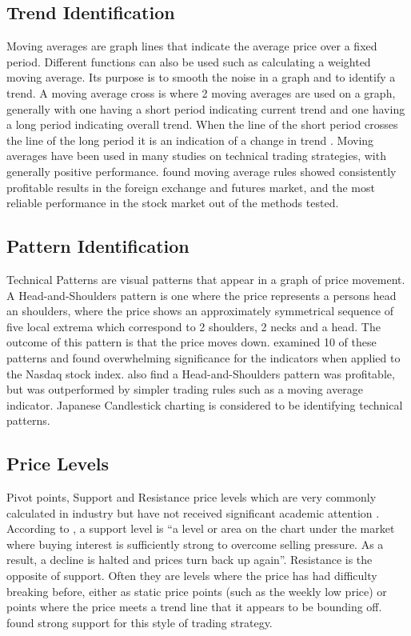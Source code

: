 \documentclass{article}
\theoremstyle{definition}
\begin{document}
\subsection{Trend Identification}
Moving averages are graph lines that indicate the average price over a fixed period. Different functions can also be used such as calculating a weighted moving average. Its purpose is to smooth the noise in a graph and to identify a trend. A moving average cross is where 2 moving averages are used on a graph, generally with one having a short period indicating current trend and one having a long period indicating overall trend. When the line of the short period crosses the line of the long period it is an indication of a change in trend \citep{brock1992}. Moving averages have been used in many studies on technical trading strategies, with generally positive performance. \cite{taprofitability} found moving average rules showed consistently profitable results in the foreign exchange and futures market, and the most reliable performance in the stock market out of the methods tested.

\subsection{Pattern Identification}
Technical Patterns are visual patterns that appear in a graph of price movement. A Head-and-Shoulders pattern is one where the price represents a persons head an shoulders, where the price shows an approximately symmetrical sequence of five local extrema which correspond to 2 shoulders, 2 necks and a head. The outcome of this pattern is that the price moves down. \cite{foundations} examined 10 of these patterns and found overwhelming significance for the indicators when applied to the Nasdaq stock index. \cite{chang1999methodical} also find a Head-and-Shoulders pattern was profitable, but was outperformed by simpler trading rules such as a moving average indicator. Japanese Candlestick charting is considered to be identifying technical patterns.

\subsection{Price Levels}
Pivot points, Support and Resistance price levels which are very commonly calculated in industry but have not received significant academic attention \citep[p. 55]{osler2000support}. According to \cite{murphy1999technical}, a support level is ``a level or area on the chart under the market where buying interest is sufficiently strong to overcome selling pressure. As a result, a decline is halted and prices turn back up again''. Resistance is the opposite of support. Often they are levels where the price has had difficulty breaking before, either as static price points (such as the weekly low price) or points where the price meets a trend line that it appears to be bounding off. \cite{brock1992} found strong support for this style of trading strategy.




\end{document}
